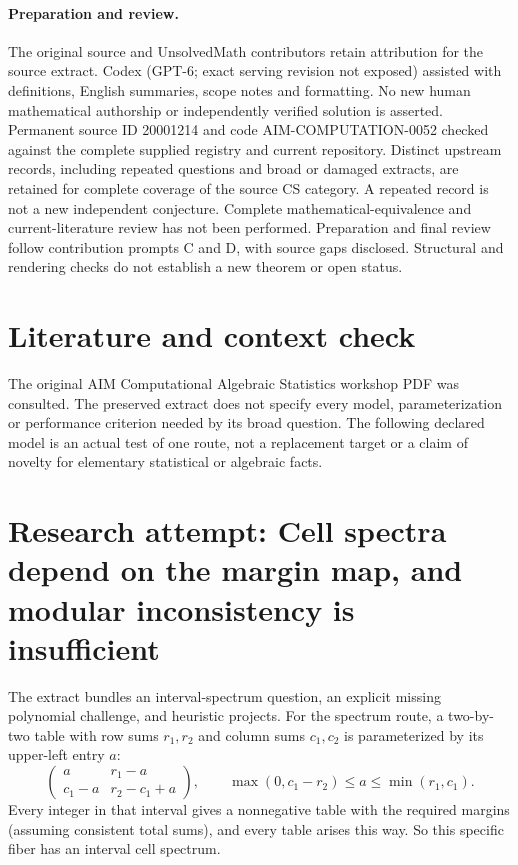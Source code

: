\documentclass[11pt]{article}
\begin{document}
\paragraph{Preparation and review.}
The original source and UnsolvedMath contributors retain attribution for the source extract. Codex (GPT-6; exact serving revision not exposed) assisted with definitions, English summaries, scope notes and formatting. No new human mathematical authorship or independently verified solution is asserted. Permanent source ID 20001214 and code AIM-COMPUTATION-0052 checked against the complete supplied registry and current repository. Distinct upstream records, including repeated questions and broad or damaged extracts, are retained for complete coverage of the source CS category. A repeated record is not a new independent conjecture. Complete mathematical-equivalence and current-literature review has not been performed. Preparation and final review follow contribution prompts C and D, with source gaps disclosed. Structural and rendering checks do not establish a new theorem or open status.
\label{end:20001214}

\section{Literature and context check}
The original AIM Computational Algebraic Statistics
 workshop PDF was consulted. The preserved extract does not specify every model,
 parameterization or performance criterion needed by its broad question. The
 following declared model is an actual test of one route, not a replacement
 target or a claim of novelty for elementary statistical or algebraic facts.
\section{Research attempt: Cell spectra depend on the margin map, and modular inconsistency is insufficient}
The extract bundles an interval-spectrum question, an explicit missing
polynomial challenge, and heuristic projects. For the spectrum route, a
two-by-two table with row sums $r_1,r_2$ and column sums $c_1,c_2$ is
parameterized by its upper-left entry $a$:
\[
 \begin{pmatrix}a&r_1-a\\c_1-a&r_2-c_1+a\end{pmatrix},\qquad
 \max(0,c_1-r_2)\le a\le\min(r_1,c_1).
\]
Every integer in that interval gives a nonnegative table with the required
margins (assuming consistent total sums), and every table arises this way.
So this specific fiber has an interval cell spectrum.
\end{document}
